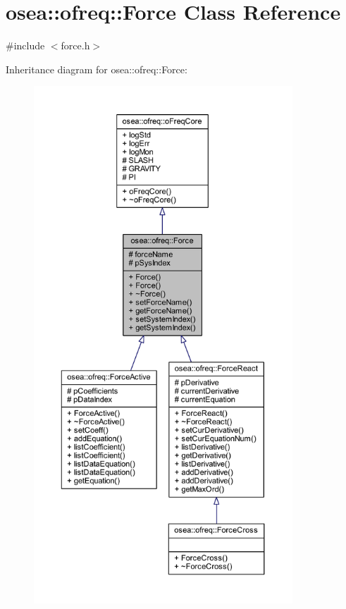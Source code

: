 \hypertarget{classosea_1_1ofreq_1_1_force}{\section{osea\-:\-:ofreq\-:\-:Force Class Reference}
\label{classosea_1_1ofreq_1_1_force}
}


{\ttfamily \#include $<$force.\-h$>$}



Inheritance diagram for osea\-:\-:ofreq\-:\-:Force\-:
\nopagebreak
\begin{figure}[H]
\begin{center}
\leavevmode
\includegraphics[height=550pt]{classosea_1_1ofreq_1_1_force__inherit__graph}
\end{center}
\end{figure}
